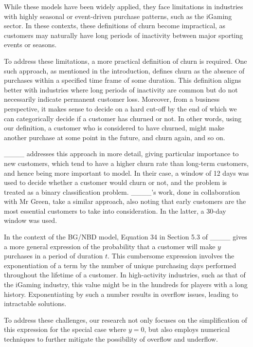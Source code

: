 While these models have been widely applied, they face limitations in industries with highly seasonal or event-driven purchase patterns, such as the iGaming sector. In these contexts, these definitions of churn become impractical, as customers may naturally have long periods of inactivity between major sporting events or seasons. 

To address these limitations, a more practical definition of churn is required. One such approach, as mentioned in the introduction, defines churn as the absence of purchases within a specified time frame of some duration. This definition aligns better with industries where long periods of inactivity are common but do not necessarily indicate permanent customer loss. Moreover, from a business perspective, it makes sense to decide on a hard cut-off by the end of which we can categorically decide if a customer has churned or not. In other words, using our definition, a customer who is considered to have churned, might make another purchase at some point in the future, and churn again, and so on.

____ addresses this approach in more detail, giving particular importance to new customers, which tend to have a higher churn rate than long-term customers, and hence being more important to model. In their case, a window of 12 days was used to decide whether a customer would churn or not, and the problem is treated as a binary classification problem. ____'s work, done in collaboration with Mr Green, take a similar approach, also noting that early customers are the most essential customers to take into consideration. In the latter, a 30-day window was used.

In the context of the BG/NBD model, Equation 34 in Section 5.3 of ____ gives a more general expression of the probability that a customer will make $y$ purchases in a period of duration $t$. This cumbersome expression involves the exponentiation of a term by the number of unique purchasing days performed throughout the lifetime of a customer. In high-activity industries, such as that of the iGaming industry, this value might be in the hundreds for players with a long history. Exponentiating by such a number results in overflow issues, leading to intractable solutions. 

To address these challenges, our research not only focuses on the simplification of this expression for the special case where $y=0$, but also employs numerical techniques to further mitigate the possibility of overflow and underflow. 

